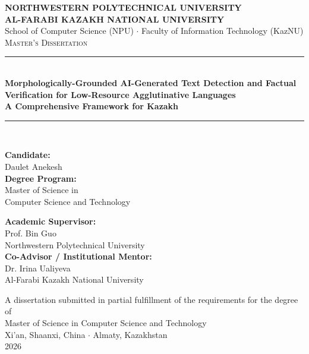 \begin{titlepage}
\begin{center}
    \vspace*{0.5cm}

    {\large \textbf{NORTHWESTERN POLYTECHNICAL UNIVERSITY}} \\
    {\large \textbf{AL-FARABI KAZAKH NATIONAL UNIVERSITY}} \\[0.5cm]

    {\small School of Computer Science (NPU) \quad $\cdot$ \quad Faculty of Information Technology (KazNU)} \\[1.8cm]

    {\large \textsc{Master's Dissertation}} \\[1.2cm]

    \rule{\linewidth}{1.5pt} \\[0.4cm]
    {\LARGE \textbf{Morphologically-Grounded AI-Generated Text Detection and Factual Verification for Low-Resource Agglutinative Languages}} \\[0.3cm]
    {\Large \textbf{A Comprehensive Framework for Kazakh}} \\
    \rule{\linewidth}{1.5pt} \\[1.8cm]

    \begin{minipage}[t]{0.48\textwidth}
        \flushleft
        \textbf{Candidate:}\\
        {\large Daulet Anekesh} \\[0.5cm]
        \textbf{Degree Program:}\\
        Master of Science in\\
        Computer Science and Technology
    \end{minipage}
    \hfill
    \begin{minipage}[t]{0.48\textwidth}
        \flushright
        \textbf{Academic Supervisor:}\\
        {\large Prof. Bin Guo} \\
        {\small Northwestern Polytechnical University} \\[0.5cm]
        \textbf{Co-Advisor / Institutional Mentor:}\\
        {\large Dr. Irina Ualiyeva} \\
        {\small Al-Farabi Kazakh National University}
    \end{minipage}

    \vfill

    {\large A dissertation submitted in partial fulfillment of the requirements for the degree of\\
    Master of Science in Computer Science and Technology} \\[1.2cm]

    {\large Xi'an, Shaanxi, China \quad $\cdot$ \quad Almaty, Kazakhstan} \\
    {\large 2026}

\end{center}
\end{titlepage}
